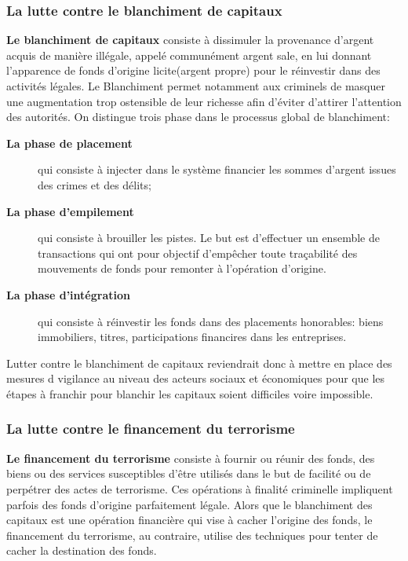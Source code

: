  \subsubsection{La lutte contre le blanchiment de capitaux} 

\textbf{Le blanchiment de capitaux} consiste à dissimuler la provenance d'argent acquis
de manière illégale, appelé communément \og{}argent sale\fg{}, en lui donnant
l'apparence de fonds d'origine licite(\og{}argent propre\fg{}) pour le
réinvestir dans des activités légales.
Le Blanchiment permet notamment aux criminels de masquer une augmentation
trop ostensible de leur richesse afin d'éviter d'attirer l'attention des autorités.
On distingue trois phase dans le processus global de blanchiment:
\begin{description}
  \item[\textbf{La phase de placement}] qui consiste à injecter dans le système financier
    les sommes d'argent issues des crimes et des délits; 
  \item[\textbf{La phase d'empilement}] qui consiste à brouiller les pistes. Le but est 
    d'effectuer un ensemble de transactions qui ont pour objectif d'empêcher 
    toute traçabilité des mouvements de fonds pour remonter à l'opération 
    d'origine.
  \item[\textbf{La phase d'intégration}] qui consiste à réinvestir les fonds
    dans des placements honorables: biens immobiliers, titres, participations
    financires dans les entreprises.
\end{description}

Lutter contre le blanchiment de capitaux reviendrait donc à mettre 
en place des mesures d vigilance au niveau des acteurs sociaux et économiques
pour que les étapes à franchir pour blanchir les capitaux soient difficiles
voire impossible. \cite{reglementaml}

\subsubsection{La lutte contre le financement du terrorisme}

\textbf{Le financement du terrorisme} consiste à fournir ou réunir des fonds,
des biens ou des services susceptibles d'être utilisés dans le but de facilité
ou de perpétrer des actes de terrorisme.
Ces opérations à finalité criminelle impliquent parfois des fonds d'origine
parfaitement légale.
Alors que le blanchiment des capitaux est une opération financière qui vise 
à cacher l'origine des fonds, le  financement du terrorisme, au contraire,
utilise des techniques pour tenter de cacher la destination des fonds.

